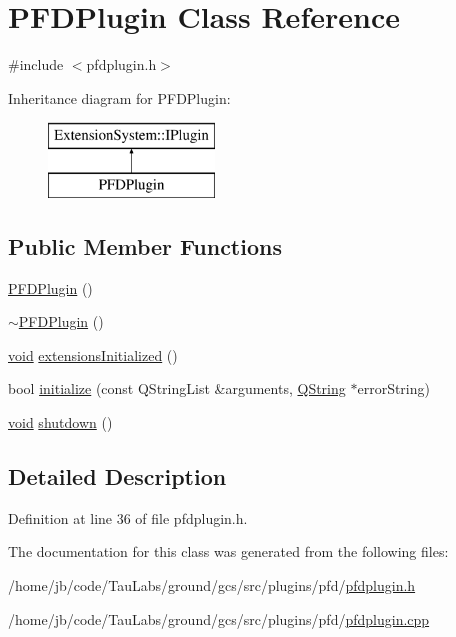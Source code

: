 \hypertarget{class_p_f_d_plugin}{\section{\-P\-F\-D\-Plugin \-Class \-Reference}
\label{class_p_f_d_plugin}
}


{\ttfamily \#include $<$pfdplugin.\-h$>$}

\-Inheritance diagram for \-P\-F\-D\-Plugin\-:\begin{figure}[H]
\begin{center}
\leavevmode
\includegraphics[height=2.000000cm]{class_p_f_d_plugin}
\end{center}
\end{figure}
\subsection*{\-Public \-Member \-Functions}
\begin{DoxyCompactItemize}
\item 
\hyperlink{group___p_f_d_plugin_gaae905eda9a2b7787c1c4bde899b1d9ad}{\-P\-F\-D\-Plugin} ()
\item 
\hyperlink{group___p_f_d_plugin_ga87aa31c062c14f56bd9ef0cc4f656d89}{$\sim$\-P\-F\-D\-Plugin} ()
\item 
\hyperlink{group___u_a_v_objects_plugin_ga444cf2ff3f0ecbe028adce838d373f5c}{void} \hyperlink{group___p_f_d_plugin_ga4db36e2e23e4ade00fcf37bf863c4232}{extensions\-Initialized} ()
\item 
bool \hyperlink{group___p_f_d_plugin_ga9494fd7b5f521ffd086c63287ad01a18}{initialize} (const \-Q\-String\-List \&arguments, \hyperlink{group___u_a_v_objects_plugin_gab9d252f49c333c94a72f97ce3105a32d}{\-Q\-String} $\ast$error\-String)
\item 
\hyperlink{group___u_a_v_objects_plugin_ga444cf2ff3f0ecbe028adce838d373f5c}{void} \hyperlink{group___p_f_d_plugin_ga378193e80b5473898ab8a75bbfe0d4bb}{shutdown} ()
\end{DoxyCompactItemize}


\subsection{\-Detailed \-Description}


\-Definition at line 36 of file pfdplugin.\-h.



\-The documentation for this class was generated from the following files\-:\begin{DoxyCompactItemize}
\item 
/home/jb/code/\-Tau\-Labs/ground/gcs/src/plugins/pfd/\hyperlink{pfdplugin_8h}{pfdplugin.\-h}\item 
/home/jb/code/\-Tau\-Labs/ground/gcs/src/plugins/pfd/\hyperlink{pfdplugin_8cpp}{pfdplugin.\-cpp}\end{DoxyCompactItemize}
